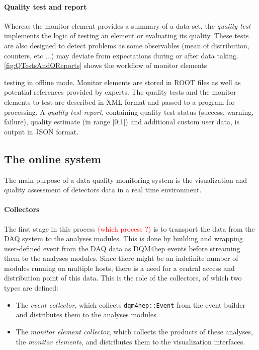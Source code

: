 \documentclass{webofc}
\begin{document}
{\paragraph{Quality test and report}

Whereas the monitor element provides a summary of a data set, the \textit{quality test} implements the logic of testing 
an element or evaluating its quality. These tests are also designed to detect problems as some observables (mean of 
distribution, counters, etc ...) may deviate from expectations during or after data taking. \autoref{fig:QTestsAndQReports} 
shows the workflow of monitor elements 

} %
\noindent testing in offline mode. Monitor elements are stored in ROOT files as well as potential 
references provided by experts. 
The quality tests and the monitor elements to test are described in XML format and passed to 
a program for processing. A \textit{quality test report}, containing quality test status (success, warning, failure), quality estimate 
(in range [0;1]) and additional custom user data, is output in JSON format.

\subsection{The online system}
\label{subsec:online}
The main purpose of a data quality monitoring system is the visualization and quality assessment of detectors data in a real time environment.

\paragraph{Collectors}\label{par:Collectors}
The first stage in this process \textcolor{red}{(which process ?)} is to transport the data from the DAQ system to the analyses modules.
This is done by building and wrapping user-defined event from the DAQ data as DQM4hep events before streaming them to the analyses modules.
Since there might be an indefinite number of modules running on multiple hosts, there is a need for a central access and distribution point of this data. This is the role of the collectors, of which two types are defined:

\begin{itemize}
  \item The \textit{event collector}, which collects \texttt{dqm4hep::Event} from the event builder and distributes them to the analyses modules. 
  \item The \textit{monitor element collector}, which collects the products of these analyses, the \textit{monitor elements}, and distributes them to the visualization interfaces.
\end{itemize}
\end{document}
